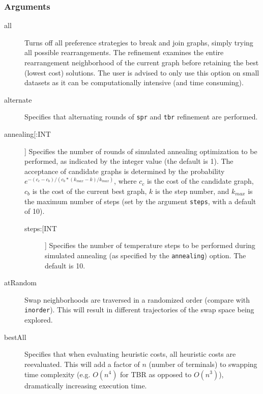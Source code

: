 	\subsubsection{Arguments}
	\begin{description}
	
		\item[all] Turns off all preference strategies to break and join graphs, simply trying all 
		possible rearrangements. The refinement examines the entire rearrangement neighborhood 
		of the current graph before retaining the best (lowest cost) solutions. The user is advised to
		only use this option on small datasets as it can be computationally intensive (and 
		time consuming).

		\item[alternate] Specifies that alternating rounds of \texttt{spr} \citep{Dayhoff1969} 
		and \texttt{tbr} \citep{Farris1988, swofford1990a} refinement are performed.
		
		\item[annealing[:INT]] Specifies the number of rounds of simulated annealing 
		\citep{Metropolisetal1953,Kirkpatricketal1983,Cerny1985} optimization to be performed, 
		as indicated by the integer value (the default is 1). The acceptance of candidate graphs 
		is determined by the probability $e ^ {- (c_c - c_b)/ (c_b * (k_{max} -k)/ k_{max})}$, 
		where $c_c$ is the cost of the candidate graph, $c_b$ is the cost of the current best 
		graph, $k$ is the step number, and $k_{max}$ is the maximum number of steps (set 
		by the argument \texttt{steps}, with a default of 10).
			
		\begin{description}
			
			\item[steps:[INT]] Specifies the number of temperature steps to be performed during 
			simulated annealing (as specified by the \texttt{annealing}) option. The default is 10.
			
		\end{description}
		
		\item[atRandom] Swap neighborhoods are traversed in a randomized order (compare 
		with \texttt{inorder}). 	This will result in different trajectories of the swap space being 
		explored. %
		
		\item[bestAll] Specifies that when evaluating heuristic costs, all heuristic costs are 
		reevaluated. This will add a factor of $n$ (number of terminals) to swapping time complexity
		(e.g. $O(n^4)$ for TBR as opposed to $O(n^3)$), dramatically increasing execution time.
		

\end{description}
